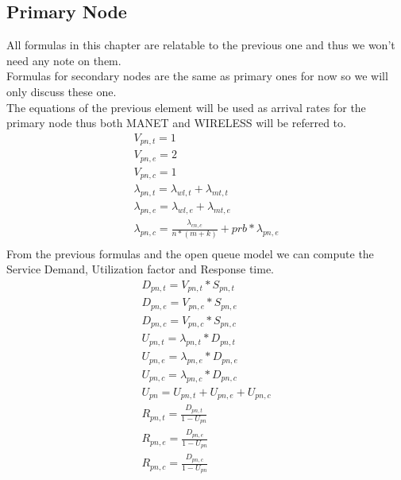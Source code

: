 \documentclass[11pt]{article}
\begin{document}
\subsection{Primary Node}
All formulas in this chapter are relatable to the previous one and thus we won't need any note on them.\\
Formulas for secondary nodes are the same as primary ones for now so we will only discuss these one.\\
The equations of the previous element will be used as arrival rates for the primary node thus both MANET and WIRELESS will be referred to.
\begin{equation}
    \begin{array}{l}
        V_{pn, t} = 1 \\
        V_{pn, e} = 2 \\ %
        V_{pn,c} = 1 \\
        \lambda_{pn, t} = \lambda_{wl, t} + \lambda_{mt, t} \\
        \lambda_{pn, e} = \lambda_{wl, e} + \lambda_{mt, e} \\
        \lambda_{pn, c} = \frac{\lambda_{cn, c}}{n*(m+k)} + prb * \lambda_{pn, e}  \\\
    \end{array}
\end{equation}
From the previous formulas and the open queue model we can compute the Service Demand, Utilization factor and Response time.
\begin{equation}
    \begin{array}{l}
        D_{pn, t} = V_{pn, t} * S_{pn, t} \\
        D_{pn, e} = V_{pn, e} * S_{pn, e} \\
        D_{pn, c} = V_{pn, c} * S_{pn, c} \\
        U_{pn, t} = \lambda_{pn, t} * D_{pn, t} \\
        U_{pn, e} = \lambda_{pn, e} * D_{pn, e} \\
        U_{pn, c} = \lambda_{pn, c} * D_{pn, c} \\
        U_{pn} = U_{pn, t} + U_{pn, e} + U_{pn, c} \\
        R_{pn, t} = \frac{D_{pn, t}}{1 - U_{pn}} \\
        R_{pn, e} = \frac{D_{pn, e}}{1 - U_{pn}} \\
        R_{pn, c} = \frac{D_{pn, c}}{1 - U_{pn}} \\
    \end{array}
\end{equation}
\end{document}

